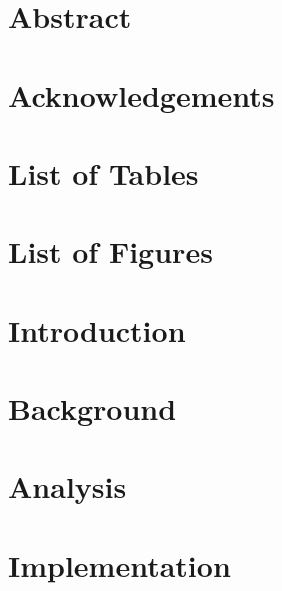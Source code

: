 




%




\setcounter{secnumdepth}{-1}
\frontmatter{}

\chapter{Abstract}


\chapter{Acknowledgements}


\pagebreak


\setcounter{tocdepth}{3}
\setcounter{secnumdepth}{3}

\tableofcontents*
\chapter*{List of Tables}
\chapter*{List of Figures}








\mainmatter{}

\chapter{Introduction}\label{intro}


\chapter{Background}\label{background}


\chapter{Analysis}\label{analysis}


\chapter{Implementation}\label{implementation}


